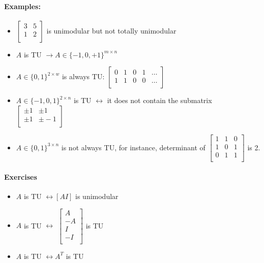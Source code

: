 \documentclass[main]{subfiles}
\begin{document}
\paragraph{Examples:}
\begin{itemize}
\item
$\begin{bmatrix}
3 & 5\\
1 & 2 \\
\end{bmatrix}$ is unimodular but not totally unimodular
\item $A$ is TU $\rightarrow A \in \{-1, 0, +1\}^{m \times n}$
\item $A \in \{0, 1\}^{2 \times w}$ is always TU: 
$\begin{bmatrix}
0 & 1 & 0 & 1 & \dots \\
1 & 1 & 0 & 0 & \dots \\
\end{bmatrix}$
\item $A \in \{-1, 0, 1\}^{2 \times n}$ is TU $\leftrightarrow$ it does not contain the submatrix 
$\begin{bmatrix}
\pm 1 & \pm 1 \\
\pm 1 & \pm -1  \\
\end{bmatrix}$
\item $A \in \{0,1\}^{3 \times n}$ is not always TU, for instance, determinant of 
$\begin{bmatrix}
1 & 1 & 0 \\
1 & 0 & 1 \\
0 & 1 & 1 \\
\end{bmatrix}$ is 2.
\end{itemize}

\paragraph{Exercises}
\begin{itemize}
\item $A$ is TU $\leftrightarrow [AI]$ is unimodular
\item $A$ is TU $\leftrightarrow$
$\begin{bmatrix}
A \\
-A \\
I \\
-I \\
\end{bmatrix}$ is TU
\item $A$ is TU $\leftrightarrow A^{T}$ is TU
\end{itemize}
\end{document}
